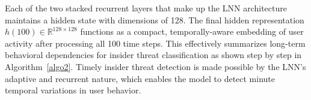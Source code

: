 Each of the two stacked recurrent layers that make up the LNN architecture maintains a hidden state with dimensions of 128.  The final hidden representation \(h(100) \in \mathbb{R}^{128 \times 128}\) functions as a compact, temporally-aware embedding of user activity after processing all 100 time steps. This effectively summarizes long-term behavioral dependencies for insider threat classification as shown step by step in Algorithm~\ref{algo2}. Timely insider threat detection is made possible by the LNN's adaptive and recurrent nature, which enables the model to detect minute temporal variations in user behavior.
